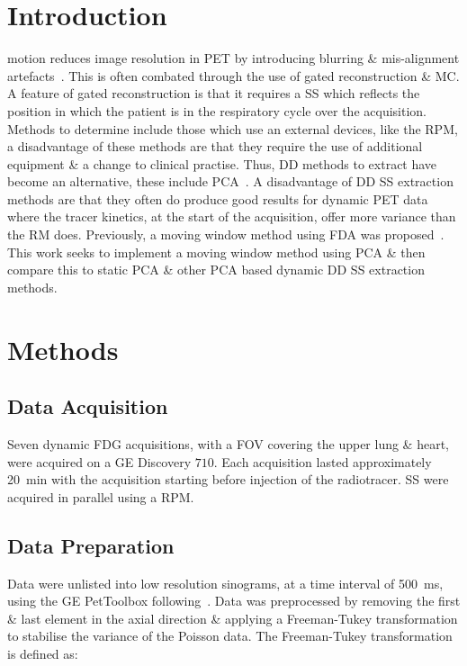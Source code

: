 \section{Introduction} \label{sec:introduction}
     motion reduces image resolution in \gls{PET} by introducing blurring \& mis-alignment artefacts~\cite{Nehmeh2008a}. This is often combated through the use of gated reconstruction \& \gls{MC}. A feature of gated reconstruction is that it requires a \gls{SS} which reflects the position in which the patient is in the respiratory cycle over the acquisition. Methods to determine  include those which use an external devices, like the \gls{RPM}, a disadvantage of these methods are that they require the use of additional equipment \& a change to clinical practise. Thus, \gls{DD} methods to extract  have become an alternative, these include \gls{PCA}~\cite{Thielemans2011}. A disadvantage of \gls{DD} \gls{SS} extraction methods are that they often do produce good results for dynamic \gls{PET} data where the tracer kinetics, at the start of the acquisition, offer more variance than the \gls{RM} does. Previously, a moving window method using \gls{FDA} was proposed~\cite{Schleyer2014}. This work seeks to implement a moving window method using \gls{PCA} \& then compare this to static \gls{PCA} \& other \gls{PCA} based dynamic \gls{DD} \gls{SS} extraction methods.
    
\vspace{-0.0cm}

\section{Methods} \label{sec:methods}
    \subsection{Data Acquisition} \label{sec:data_acquisition}
        Seven dynamic \gls{FDG} acquisitions, with a \gls{FOV} covering the upper lung \& heart, were acquired on a \gls{GE} Discovery $710$. Each acquisition lasted approximately \SI{20}{\minute} with the acquisition starting before injection of the radiotracer. \gls{SS} were acquired in parallel using a \gls{RPM}.
        
    \vspace{-0.5cm}
        
    \subsection{Data Preparation} \label{sec:data_preparation}
        Data were unlisted into low resolution sinograms, at a time interval of \SI{500}{\milli\second}, using the \gls{GE} PetToolbox following~\cite{Bertolli2018Data-DrivenTomography}. Data was preprocessed by removing the first \& last element in the axial direction \& applying a Freeman-Tukey transformation to stabilise the variance of the Poisson data. The Freeman-Tukey transformation is defined as:
        

